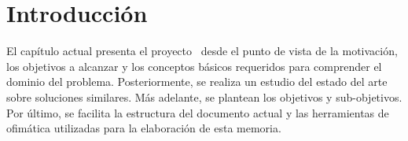 \chapter{Introducción}
\label{sec:introduction}

\def \introIntroduction {El capítulo actual presenta el proyecto \myApp\ desde el punto de vista de la motivación, los objetivos a alcanzar y los conceptos básicos requeridos para comprender el dominio del problema. Posteriormente, se realiza un estudio del estado del arte sobre soluciones similares. Más adelante, se plantean los objetivos y sub-objetivos. Por último, se facilita la estructura del documento actual y las herramientas de ofimática utilizadas para la elaboración de esta memoria.}

\introIntroduction

